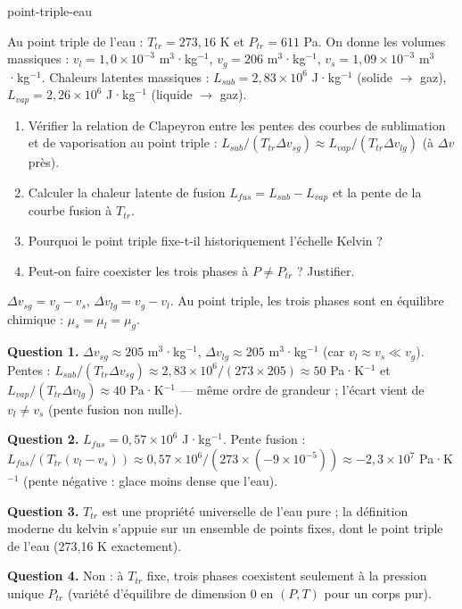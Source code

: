 \begin{exo}{point-triple-eau}

Au point triple de l'eau : $T_{tr} = 273{,}16$ K et $P_{tr} = 611$ Pa. On donne les volumes massiques : $v_l = 1{,}0\times10^{-3}$ m$^3$·kg$^{-1}$, $v_g = 206$ m$^3$·kg$^{-1}$, $v_s = 1{,}09\times10^{-3}$ m$^3$·kg$^{-1}$. Chaleurs latentes massiques : $L_{sub} = 2{,}83\times10^6$ J·kg$^{-1}$ (solide $\to$ gaz), $L_{vap} = 2{,}26\times10^6$ J·kg$^{-1}$ (liquide $\to$ gaz).

\begin{enumerate}
\item Vérifier la relation de Clapeyron entre les pentes des courbes de sublimation et de vaporisation au point triple : $L_{sub}/(T_{tr}\Delta v_{sg}) \approx L_{vap}/(T_{tr}\Delta v_{lg})$ (à $\Delta v$ près).
\item Calculer la chaleur latente de fusion $L_{fus} = L_{sub} - L_{vap}$ et la pente de la courbe fusion à $T_{tr}$.
\item Pourquoi le point triple fixe-t-il historiquement l'échelle Kelvin ?
\item Peut-on faire coexister les trois phases à $P \neq P_{tr}$ ? Justifier.
\end{enumerate}

\begin{indication}
$\Delta v_{sg} = v_g - v_s$, $\Delta v_{lg} = v_g - v_l$. Au point triple, les trois phases sont en équilibre chimique : $\mu_s = \mu_l = \mu_g$.
\end{indication}

\begin{solution}
\textbf{Question 1.} $\Delta v_{sg} \approx 205$ m$^3$·kg$^{-1}$, $\Delta v_{lg} \approx 205$ m$^3$·kg$^{-1}$ (car $v_l \approx v_s \ll v_g$). Pentes : $L_{sub}/(T_{tr}\Delta v_{sg}) \approx 2{,}83\times10^6/(273\times205) \approx 50$ Pa·K$^{-1}$ et $L_{vap}/(T_{tr}\Delta v_{lg}) \approx 40$ Pa·K$^{-1}$ — même ordre de grandeur ; l'écart vient de $v_l \neq v_s$ (pente fusion non nulle).

\textbf{Question 2.} $L_{fus} = 0{,}57\times10^6$ J·kg$^{-1}$. Pente fusion : $L_{fus}/(T_{tr}(v_l-v_s)) \approx 0{,}57\times10^6/(273\times(-9\times10^{-5})) \approx -2{,}3\times10^7$ Pa·K$^{-1}$ (pente négative : glace moins dense que l'eau).

\textbf{Question 3.} $T_{tr}$ est une propriété universelle de l'eau pure ; la définition moderne du kelvin s'appuie sur un ensemble de points fixes, dont le point triple de l'eau (273,16 K exactement).

\textbf{Question 4.} Non : à $T_{tr}$ fixe, trois phases coexistent seulement à la pression unique $P_{tr}$ (variété d'équilibre de dimension 0 en $(P,T)$ pour un corps pur).
\end{solution}
\end{exo}

